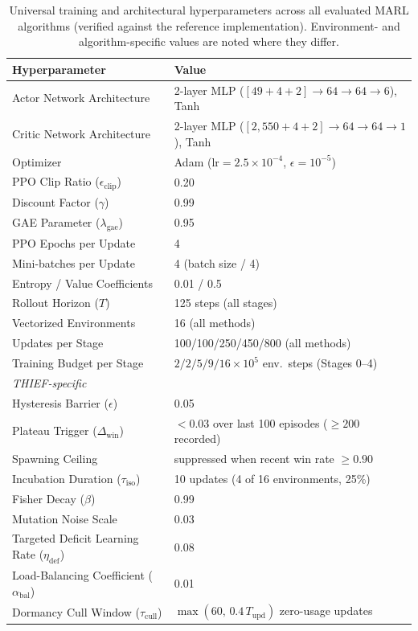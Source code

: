 \begin{table}[t]
\centering
\caption{Universal training and architectural hyperparameters across all evaluated MARL algorithms (verified against the reference implementation). Environment- and algorithm-specific values are noted where they differ.}
\label{tab:hyperparameters}
\vspace{0.04in}
\footnotesize
\setlength{\tabcolsep}{3.5pt}
\renewcommand{\arraystretch}{1.03}
\begin{tabular}{ll}
\toprule
\textbf{Hyperparameter} & \textbf{Value} \\
\midrule
Actor Network Architecture & 2-layer MLP ($[49+4+2] \rightarrow 64 \rightarrow 64 \rightarrow 6$), Tanh \\
Critic Network Architecture & 2-layer MLP ($[2,\!550+4+2] \rightarrow 64 \rightarrow 64 \rightarrow 1$), Tanh \\
Optimizer & Adam ($\text{lr} = 2.5 \times 10^{-4}$, $\epsilon = 10^{-5}$) \\
PPO Clip Ratio ($\epsilon_{\text{clip}}$) & 0.20 \\
Discount Factor ($\gamma$) & 0.99 \\
GAE Parameter ($\lambda_{\text{gae}}$) & 0.95 \\
PPO Epochs per Update & 4 \\
Mini-batches per Update & 4 (batch size / 4) \\
Entropy / Value Coefficients & 0.01 / 0.5 \\
Rollout Horizon ($T$) & 125 steps (all stages) \\
Vectorized Environments & 16 (all methods) \\
Updates per Stage & 100/100/250/450/800 (all methods) \\
Training Budget per Stage & $2/2/5/9/16 \times 10^5$ env.\ steps (Stages 0--4) \\
\midrule
\multicolumn{2}{l}{\emph{THIEF-specific}} \\
Hysteresis Barrier ($\epsilon$) & 0.05 \\
Plateau Trigger ($\Delta_{\text{win}}$) & $< 0.03$ over last 100 episodes ($\ge 200$ recorded) \\
Spawning Ceiling & suppressed when recent win rate $\ge 0.90$ \\
Incubation Duration ($\tau_{\text{iso}}$) & 10 updates (4 of 16 environments, 25\%) \\
Fisher Decay ($\beta$) & 0.99 \\
Mutation Noise Scale & 0.03 \\
Targeted Deficit Learning Rate ($\eta_{\text{def}}$) & 0.08 \\
Load-Balancing Coefficient ($\alpha_{\text{bal}}$) & 0.01 \\
Dormancy Cull Window ($\tau_{\text{cull}}$) & $\max(60,\, 0.4\,T_{\text{upd}})$ zero-usage updates \\
\bottomrule
\end{tabular}
\end{table}